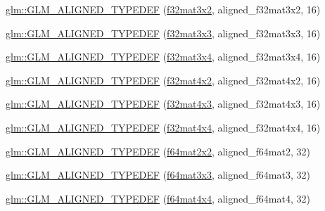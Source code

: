 \begin{DoxyCompactItemize}
\item 
\hyperlink{group__gtx__type__aligned_gac09663c42566bcb58d23c6781ac4e85a}{glm\+::\+G\+L\+M\+\_\+\+A\+L\+I\+G\+N\+E\+D\+\_\+\+T\+Y\+P\+E\+D\+EF} (\hyperlink{group__gtc__type__precision_ga61653615c76194cdf3454e6e703525e0}{f32mat3x2}, aligned\+\_\+f32mat3x2, 16)
\item 
\hyperlink{group__gtx__type__aligned_ga3f510999e59e1b309113e1d561162b29}{glm\+::\+G\+L\+M\+\_\+\+A\+L\+I\+G\+N\+E\+D\+\_\+\+T\+Y\+P\+E\+D\+EF} (\hyperlink{group__gtc__type__precision_ga715b36ea1e2d1ffaaef7517cc78b3877}{f32mat3x3}, aligned\+\_\+f32mat3x3, 16)
\item 
\hyperlink{group__gtx__type__aligned_ga2c9c94f0c89cd71ce56551db6cf4aaec}{glm\+::\+G\+L\+M\+\_\+\+A\+L\+I\+G\+N\+E\+D\+\_\+\+T\+Y\+P\+E\+D\+EF} (\hyperlink{group__gtc__type__precision_ga9995b357aa1e9603adad780cfde1aa07}{f32mat3x4}, aligned\+\_\+f32mat3x4, 16)
\item 
\hyperlink{group__gtx__type__aligned_ga99ce8274c750fbfdf0e70c95946a2875}{glm\+::\+G\+L\+M\+\_\+\+A\+L\+I\+G\+N\+E\+D\+\_\+\+T\+Y\+P\+E\+D\+EF} (\hyperlink{group__gtc__type__precision_gab531a3d0479121732ae090254e0bd58f}{f32mat4x2}, aligned\+\_\+f32mat4x2, 16)
\item 
\hyperlink{group__gtx__type__aligned_ga9476ef66790239df53dbe66f3989c3b5}{glm\+::\+G\+L\+M\+\_\+\+A\+L\+I\+G\+N\+E\+D\+\_\+\+T\+Y\+P\+E\+D\+EF} (\hyperlink{group__gtc__type__precision_gad68d998fa74028e02bfadd4778bd549a}{f32mat4x3}, aligned\+\_\+f32mat4x3, 16)
\item 
\hyperlink{group__gtx__type__aligned_gacc429b3b0b49921e12713b6d31e14e1d}{glm\+::\+G\+L\+M\+\_\+\+A\+L\+I\+G\+N\+E\+D\+\_\+\+T\+Y\+P\+E\+D\+EF} (\hyperlink{group__gtc__type__precision_gac4a4b2671cbf50ab95c55fce2bfcd811}{f32mat4x4}, aligned\+\_\+f32mat4x4, 16)
\item 
\hyperlink{group__gtx__type__aligned_ga88f6c6fa06e6e64479763e69444669cf}{glm\+::\+G\+L\+M\+\_\+\+A\+L\+I\+G\+N\+E\+D\+\_\+\+T\+Y\+P\+E\+D\+EF} (\hyperlink{group__gtc__type__precision_ga1e14d8b4e18898be51cd719fda213dcc}{f64mat2x2}, aligned\+\_\+f64mat2, 32)
\item 
\hyperlink{group__gtx__type__aligned_gaae8e4639c991e64754145ab8e4c32083}{glm\+::\+G\+L\+M\+\_\+\+A\+L\+I\+G\+N\+E\+D\+\_\+\+T\+Y\+P\+E\+D\+EF} (\hyperlink{group__gtc__type__precision_gab272e67eb87cc1e8233237480c2aa8d2}{f64mat3x3}, aligned\+\_\+f64mat3, 32)
\item 
\hyperlink{group__gtx__type__aligned_ga6e9094f3feb3b5b49d0f83683a101fde}{glm\+::\+G\+L\+M\+\_\+\+A\+L\+I\+G\+N\+E\+D\+\_\+\+T\+Y\+P\+E\+D\+EF} (\hyperlink{group__gtc__type__precision_ga6b1ada50de2fc7d991138ab857fb2476}{f64mat4x4}, aligned\+\_\+f64mat4, 32)

\end{DoxyCompactItemize}
